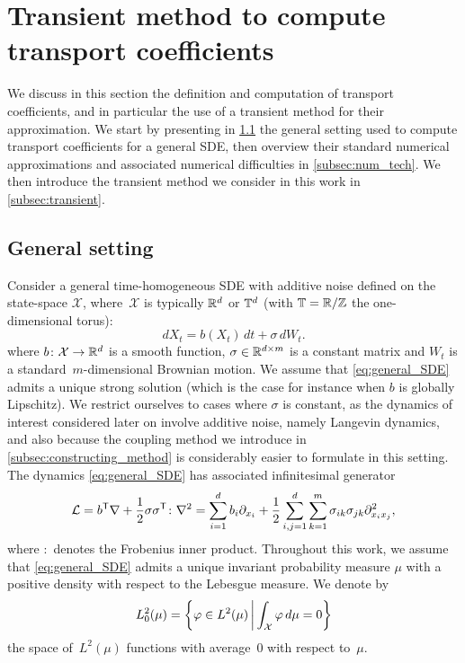 \section{Transient method to compute transport coefficients}
\label{sec:trans_coeff}
%
We discuss in this section the definition and computation of transport coefficients, and in particular the use of a transient method for their approximation. We start by presenting in \cref{subsec:gen_setting} the general setting used to compute transport coefficients for a general SDE, then overview their standard numerical approximations and associated numerical difficulties in \cref{subsec:num_tech}. We then introduce the transient method we consider in this work in \cref{subsec:transient}.

\subsection{General setting}
\label{subsec:gen_setting}
%
Consider a general time-homogeneous SDE with additive noise defined on the state-space $\mathcal{X}$, where~$\mathcal{X}$ is typically $\mathbb{R}^d$ or $\mathbb{T}^d$ (with $\mathbb{T} = \mathbb{R}/\mathbb{Z}$ the one-dimensional torus):
%
\begin{equation}
    dX_t = b(X_t) \, dt + \sigma \, dW_t.
    \label{eq:general_SDE}
\end{equation}
%
where $b\colon \mathcal{X} \to \mathbb{R}^d$ is a smooth function, $\sigma \in \mathbb{R}^{d\times m}$ is a constant matrix and $W_t$ is a standard~$m$-dimensional Brownian motion. We assume that \eqref{eq:general_SDE} admits a unique strong solution (which is the case for instance when $b$ is globally Lipschitz). We restrict ourselves to cases where $\sigma$ is constant, as the dynamics of interest considered later on involve additive noise, namely Langevin dynamics, and also because the coupling method we introduce in \cref{subsec:constructing_method} is considerably easier to formulate in this setting. The dynamics \eqref{eq:general_SDE} has associated infinitesimal generator
%
\begin{equation}
    \mathcal{L} = b^\mathsf T\nabla + \frac{1}{2}\sigma\sigma^\mathsf T \colon \nabla^2 = \sum_{i=1}^d b_i\partial_{x_i} + \frac{1}{2}\sum_{i,j=1}^d\sum_{k=1}^m \sigma_{ik}\sigma_{jk} \partial_{x_ix_j}^2,
    \label{eq:general_generator}
\end{equation}
%
where $\colon$ denotes the Frobenius inner product. Throughout this work, we assume that \eqref{eq:general_SDE} admits a unique invariant probability measure $\mu$ with a positive density with respect to the Lebesgue measure. 
We denote by 
\[
L^2_0(\mu) = \left\{\varphi \in L^2(\mu) \, \middle| \, \int_{\mathcal{X}} \varphi \, d\mu = 0\right\}
\]
the space of~$L^2(\mu)$ functions with average~0 with respect to~$\mu$.

